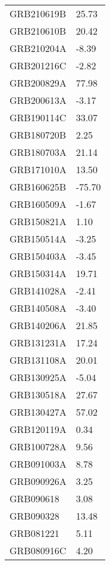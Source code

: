 \begin{tabular}{ll}
\toprule
\midrule
GRB210619B & 25.73 \\
GRB210610B & 20.42 \\
GRB210204A & -8.39 \\
GRB201216C & -2.82 \\
GRB200829A & 77.98 \\
GRB200613A & -3.17 \\
GRB190114C & 33.07 \\
GRB180720B & 2.25 \\
GRB180703A & 21.14 \\
GRB171010A & 13.50 \\
GRB160625B & -75.70 \\
GRB160509A & -1.67 \\
GRB150821A & 1.10 \\
GRB150514A & -3.25 \\
GRB150403A & -3.45 \\
GRB150314A & 19.71 \\
GRB141028A & -2.41 \\
GRB140508A & -3.40 \\
GRB140206A & 21.85 \\
GRB131231A & 17.24 \\
GRB131108A & 20.01 \\
GRB130925A & -5.04 \\
GRB130518A & 27.67 \\
GRB130427A & 57.02 \\
GRB120119A & 0.34 \\
GRB100728A & 9.56 \\
GRB091003A & 8.78 \\
GRB090926A & 3.25 \\
GRB090618 & 3.08 \\
GRB090328 & 13.48 \\
GRB081221 & 5.11 \\
GRB080916C & 4.20 \\
\bottomrule
\end{tabular}
